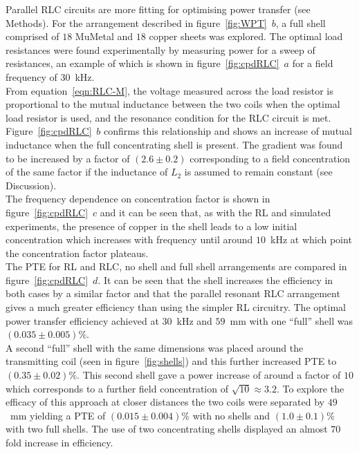 \documentclass[11pt]{iopart}
\begin{document}
Parallel RLC circuits are more fitting for optimising power
transfer (see Methods). For the arrangement
described in figure~\ref{fig:WPT}~$b$, a full shell comprised of $18$
MuMetal and $18$ copper sheets was explored. The optimal load
resistances were found experimentally by measuring power for a sweep
of resistances, an example of which is shown in
figure~\ref{fig:cpdRLC}~$a$ for a field frequency of $30$~kHz.\\
From equation~\ref{eqn:RLC-M}, the voltage measured across the load
resistor is proportional to the mutual inductance between the two
coils when the optimal load resistor is used, and the resonance
condition for the RLC circuit is met. Figure~\ref{fig:cpdRLC}~$b$
confirms this relationship and shows an increase of mutual inductance
when the full concentrating shell is present. The gradient was found
to be increased by a factor of $(2.6 \pm 0.2)$ corresponding to a field
concentration of the same factor if the inductance of $L_2$ is assumed
to remain constant (see Discussion). \\
The frequency dependence on concentration factor is shown in
figure~\ref{fig:cpdRLC}~$c$ and it can be seen that, as with the RL and
simulated experiments, the presence of copper in the shell leads to a
low initial concentration which increases with frequency until around
$10$~kHz at which point the concentration factor plateaus.\\
The PTE for RL and RLC, no shell and full shell arrangements are
compared in figure~\ref{fig:cpdRLC}~$d$. It can be seen that the shell
increases the efficiency in both cases by a similar factor and that
the parallel resonant RLC arrangement gives a much greater efficiency
than using the simpler RL circuitry. The optimal power transfer
efficiency achieved at $30$~kHz and $59$~mm with one ``full'' shell was
$(0.035\pm0.005)\%$. \\ A second ``full'' shell with the same
dimensions was placed around the transmitting coil (seen in figure~\ref{fig:shells}) and this further
increased PTE to $(0.35\pm0.02)\%$. This second shell gave a power
increase of around a factor of $10$ which corresponds to a further
field concentration of $\sqrt{10} \approx 3.2$. To explore the
efficacy of this approach at closer distances the two coils were
separated by $49$~mm yielding a PTE of $(0.015\pm0.004)\%$ with no
shells and $(1.0\pm0.1)\%$ with two full shells. The use of two
concentrating shells displayed an almost $70$ fold increase in
efficiency.
\end{document}

